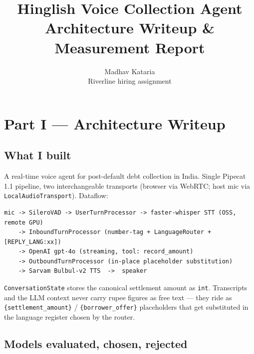 \documentclass[11pt,a4paper]{article}
\title{\textbf{Hinglish Voice Collection Agent}\\[0.2em]
  \large Architecture Writeup \& Measurement Report}
\author{Madhav Kataria\\\small Riverline hiring assignment}
\date{}
\begin{document}
\maketitle
\thispagestyle{fancy}
\vspace{-1.5em}

\section*{Part I --- Architecture Writeup}

\subsection*{What I built}

A real-time voice agent for post-default debt collection in India. Single Pipecat 1.1 pipeline, two interchangeable transports (browser via WebRTC; host mic via \texttt{LocalAudioTransport}). Dataflow:

\begin{lstlisting}
mic -> SileroVAD -> UserTurnProcessor -> faster-whisper STT (OSS, remote GPU)
    -> InboundTurnProcessor (number-tag + LanguageRouter + [REPLY_LANG:xx])
    -> OpenAI gpt-4o (streaming, tool: record_amount)
    -> OutboundTurnProcessor (in-place placeholder substitution)
    -> Sarvam Bulbul-v2 TTS  ->  speaker
\end{lstlisting}

\texttt{ConversationState} stores the canonical settlement amount as \texttt{int}. Transcripts and the LLM context never carry rupee figures as free text --- they ride as \texttt{\{settlement\_amount\}} / \texttt{\{borrower\_offer\}} placeholders that get substituted in the language register chosen by the router.

\subsection*{Models evaluated, chosen, rejected}
\end{document}
